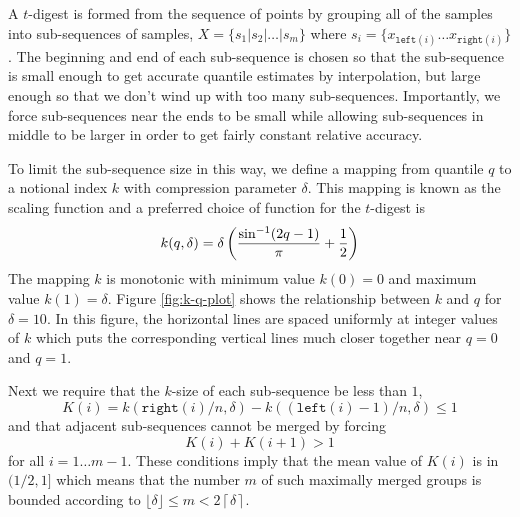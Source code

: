 \documentclass[11pt]{amsart}
\begin{document}
A $t$-digest is formed from the sequence of points by grouping all of the samples into sub-sequences of samples, $X = \lbrace s_1 | s_2 | \ldots | s_m \rbrace$ where $s_i = \lbrace x_{\mathtt {left}(i)} \ldots x_{\mathtt{right}(i)} \rbrace$.  The beginning and end of each sub-sequence is chosen so that the sub-sequence is small enough to get accurate quantile estimates by interpolation, but large enough so that we don't wind up with too many sub-sequences. Importantly, we force sub-sequences near the ends to be small while allowing sub-sequences in middle to be larger in order to get fairly constant relative accuracy.

To limit the sub-sequence size in this way, we define a mapping from quantile $q$ to a notional index $k$ with compression parameter $\delta$. This mapping is known as the scaling function and a preferred choice of function for the $t$-digest is 
\[
k(q, \delta) = \delta \left( {\frac {\sin^{-1} (2q-1)} \pi}   + {1 \over 2} \right)
\]
The mapping $k$ is monotonic with minimum value  $k(0)=0$ and maximum value  $k(1)=\delta$.  Figure \ref{fig:k-q-plot} shows the relationship between $k$ and $q$ for $\delta=10$. In this figure, the horizontal lines are spaced uniformly at integer values of $k$ which puts the corresponding vertical lines much closer together near $q=0$ and $q=1$.

Next we require that the $k$-size of each sub-sequence be less than $1$,
\[
K(i) = k \left (\mathtt{right}(i)/n, \delta \right) - k \left ((\mathtt{left}(i)-1)/n, \delta \right) \le 1
\]
and that adjacent sub-sequences cannot be merged by forcing
\[
K(i) + K(i+1) > 1
\]
for all $i=1\ldots m-1$. These conditions imply that the mean value of $K(i)$ is in $(1/2, 1]$ which means that the number $m$ of such maximally merged groups is bounded according to $ \lfloor\delta\rfloor \le m < 2\left \lceil\delta \right \rceil$. 
\end{document}
